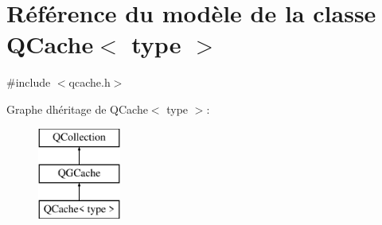 \hypertarget{class_q_cache}{}\section{Référence du modèle de la classe Q\+Cache$<$ type $>$}
\label{class_q_cache}


{\ttfamily \#include $<$qcache.\+h$>$}

Graphe d\textquotesingle{}héritage de Q\+Cache$<$ type $>$\+:\begin{figure}[H]
\begin{center}
\leavevmode
\includegraphics[height=3.000000cm]{class_q_cache}
\end{center}
\end{figure}
